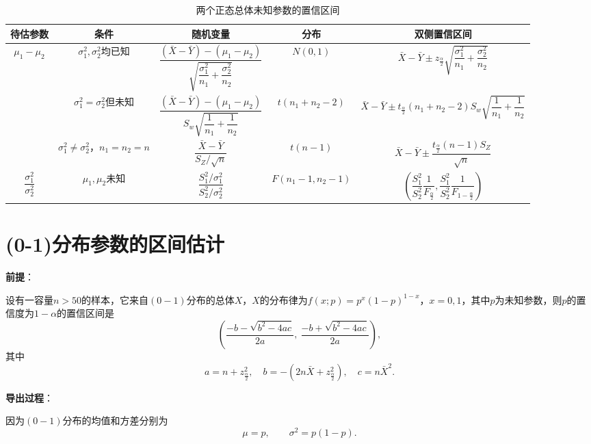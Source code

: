 \documentclass[11pt,a4paper]{report}
\theoremstyle{definition}
\begin{document}
\begin{table}[htbp]
\centering
\caption{两个正态总体未知参数的置信区间}
\begin{tabular}{@{}ccccc@{}}
\toprule
\textbf{待估参数} & \textbf{条件} & \textbf{随机变量} & \textbf{分布} & \textbf{双侧置信区间} \\
\midrule
\multirow{3}{*}{$\mu_{1}-\mu_{2}$} & $\sigma_{1}^{2},\sigma_{2}^{2}$均已知 & $\dfrac{(\bar{X}-\bar{Y})-(\mu_{1}-\mu_{2})}{\sqrt{\dfrac{\sigma_{1}^{2}}{n_{1}}+\dfrac{\sigma_{2}^{2}}{n_{2}}}}$ & $N(0,1)$ & $\bar{X}-\bar{Y}\pm z_{\frac{\alpha}{2}}\sqrt{\dfrac{\sigma_{1}^{2}}{n_{1}}+\dfrac{\sigma_{2}^{2}}{n_{2}}}$ \\
\cmidrule{2-5}
 & $\sigma_{1}^{2}=\sigma_{2}^{2}$但未知 & $\dfrac{(\bar{X}-\bar{Y})-(\mu_{1}-\mu_{2})}{S_{w}\sqrt{\dfrac{1}{n_{1}}+\dfrac{1}{n_{2}}}}$ & $t(n_{1}+n_{2}-2)$ & $\bar{X}-\bar{Y}\pm t_{\frac{\alpha}{2}}(n_{1}+n_{2}-2)S_{w}\sqrt{\dfrac{1}{n_{1}}+\dfrac{1}{n_{2}}}$ \\
\cmidrule{2-5}
 & $\sigma_{1}^{2}\neq\sigma_{2}^{2}$，$n_{1}=n_{2}=n$ & $\dfrac{\bar{X}-\bar{Y}}{S_{Z}/\sqrt{n}}$ & $t(n-1)$ & $\bar{X}-\bar{Y}\pm\dfrac{t_{\frac{\alpha}{2}}(n-1)S_{Z}}{\sqrt{n}}$ \\
\midrule
$\dfrac{\sigma_{1}^{2}}{\sigma_{2}^{2}}$ & $\mu_{1},\mu_{2}$未知 & $\dfrac{S_{1}^{2}/\sigma_{1}^{2}}{S_{2}^{2}/\sigma_{2}^{2}}$ & $F(n_{1}-1,n_{2}-1)$ & $\left(\dfrac{S_{1}^{2}}{S_{2}^{2}}\dfrac{1}{F_{\frac{\alpha}{2}}},\dfrac{S_{1}^{2}}{S_{2}^{2}}\dfrac{1}{F_{1-\frac{\alpha}{2}}}\right)$ \\
\bottomrule
\end{tabular}
\end{table}

\section{(0-1)分布参数的区间估计}

\textbf{前提}：

设有一容量$n>50$的样本，它来自$(0-1)$分布的总体$X$，$X$的分布律为$f(x;p)=p^{x}(1-p)^{1-x}$，$x=0,1$，其中$p$为未知参数，则$p$的置信度为$1-\alpha$的置信区间是
\[
\left(\frac{-b-\sqrt{b^{2}-4ac}}{2a},\ \frac{-b+\sqrt{b^{2}-4ac}}{2a}\right),
\]
其中
\[
a=n+z_{\frac{\alpha}{2}}^{2},\quad b=-(2n\bar{X}+z_{\frac{\alpha}{2}}^{2}),\quad c=n\bar{X}^{2}.
\]

\textbf{导出过程}：

因为$(0-1)$分布的均值和方差分别为
\[
\mu=p,\qquad \sigma^{2}=p(1-p).
\]
\end{document}

